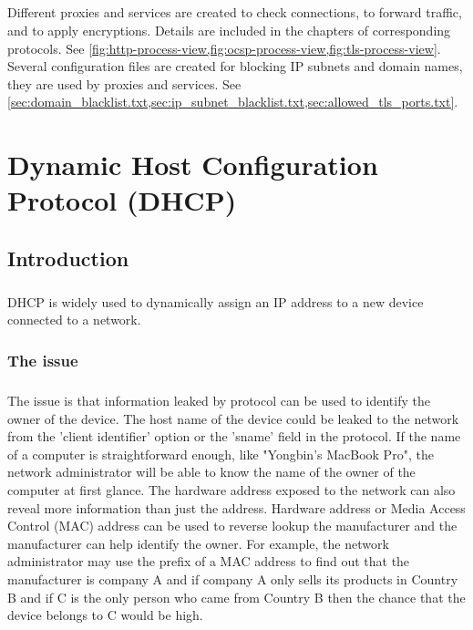 \documentclass[mscthesis]{usiinfthesis}
\begin{document}
\paragraph{}
Different proxies and services are created to check connections, to forward traffic, and to apply encryptions. Details are included in the chapters of corresponding protocols. See \cref{fig:http-process-view,fig:ocsp-process-view,fig:tls-process-view}. Several configuration files are created for blocking IP subnets and domain names, they are used by proxies and services. See \cref{sec:domain_blacklist.txt,sec:ip_subnet_blacklist.txt,sec:allowed_tls_ports.txt}.

\chapter{Dynamic Host Configuration Protocol (DHCP)}\label{cha:dhcp}

\section{Introduction}
\paragraph{}
DHCP is widely used to dynamically assign an IP address to a new device connected to a network.

\subsection{The issue}
\paragraph{}
The issue is that information leaked by protocol can be used to identify the owner of the device. The host name of the device could be leaked to the network from the 'client identifier' option or the 'sname' field in the protocol.\citep{rfc:dhcp} If the name of a computer is straightforward enough, like "Yongbin's MacBook Pro", the network administrator will be able to know the name of the owner of the computer at first glance. The hardware address exposed to the network can also reveal more information than just the address. Hardware address or Media Access Control (MAC) address can be used to reverse lookup the manufacturer and the manufacturer can help identify the owner. For example, the network administrator may use the prefix of a MAC address to find out that the manufacturer is company A and if company A only sells its products in Country B and if C is the only person who came from Country B then the chance that the device belongs to C would be high.
\end{document}
